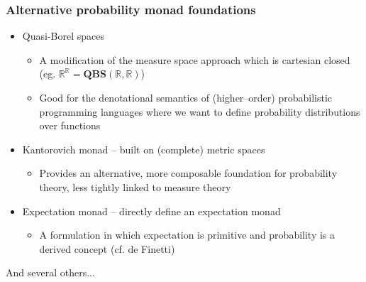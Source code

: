 \documentclass[mathserif,handout]{beamer}
\newcommand{\reals}{\mathbb{R}}
\begin{document}
\begin{frame}
  \frametitle{Alternative probability monad foundations}
  \begin{itemize}
\item \alert{Quasi-Borel spaces}
    \begin{itemize}
    \item A modification of the measure space approach which is cartesian closed (eg. $\reals^\reals = \mathbf{QBS}(\reals,\reals)$)
      \item Good for the denotational semantics of (higher--order) probabilistic programming languages where we want to define probability distributions over functions
    \end{itemize}
  \item \alert{Kantorovich monad} -- built on (complete) metric spaces
    \begin{itemize}
\item Provides an alternative, more composable foundation for probability theory, less tightly linked to measure theory
    \end{itemize}
  \item \alert{Expectation monad} -- directly define an expectation monad
    \begin{itemize}
      \item A formulation in which expectation is primitive and probability is a derived concept (cf. de Finetti)
    \end{itemize}
  \end{itemize}
And several others...
\end{frame}
\end{document}

